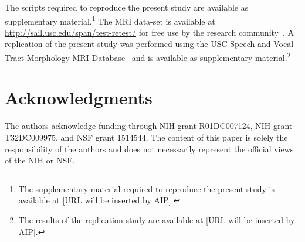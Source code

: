 \documentclass[reprint]{JASAnew}\usepackage[]{graphicx}\usepackage[]{color}
\begin{document}
The scripts required to reproduce the present study are available as supplementary material.\footnote{The supplementary material required to reproduce the present study is available at [URL will be inserted by AIP].}
%
The MRI data-set is available at \url{http://sail.usc.edu/span/test-retest/} for free use by the research community~\citep[see][]{toger2017test}.
%
A replication of the present study was performed using the USC Speech and Vocal Tract Morphology MRI Database~\citep{sorensen2017database} and is available as supplementary material.\footnote{The results of the replication study are available at [URL will be inserted by AIP].}

\section{Acknowledgments} 

The authors acknowledge funding through NIH grant R01DC007124, NIH grant T32DC009975, and NSF grant 1514544. The content of this paper is solely the responsibility of the authors and does not necessarily represent the official views of the NIH or NSF.


\end{document}
